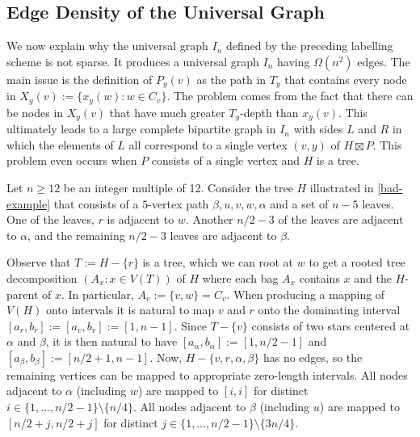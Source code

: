 \documentclass{patmorin}
\begin{document}
\subsection{Edge Density of the Universal Graph}
\label{density-lower-bound}

We now explain why the universal graph $I_n$ defined by the preceding labelling scheme is not sparse.  It produces a universal graph $I_n$ having $\Omega(n^2)$ edges.  The main issue is the definition of $P_y(v)$ as the path in $T_y$ that contains every node in $X_y(v):=\{x_y(w):w\in C_v\}$.  The problem comes from the fact that there can be nodes in $X_y(v)$ that have much greater $T_y$-depth than $x_y(v)$.  This ultimately leads to a large complete bipartite graph in $I_n$ with sides $L$ and $R$ in which the elements of $L$ all correspond to a single vertex $(v,y)$ of $H\boxtimes P$.  This problem even occurs when $P$ consists of a single vertex and $H$ is a tree.

Let $n\ge 12$ be an integer multiple of 12. Consider the tree $H$ illustrated in \cref{bad-example} that consists of a $5$-vertex path $\beta,u,v,w,\alpha$ and a set of $n-5$ leaves.  One of the leaves, $r$ is adjacent to $w$. Another $n/2-3$ of the leaves are adjacent to $\alpha$, and the remaining $n/2-3$ leaves are adjacent to $\beta$.

Observe that $T:=H-\{r\}$ is a tree, which we can root at $w$ to get a rooted tree decomposition $(A_x:x\in V(T))$ of $H$ where each bag $A_x$ contains $x$ and the $H$-parent of $x$.  In particular, $A_v:=\{v,w\}=C_v$.  When producing a mapping of $V(H)$ onto intervals it is natural to map $v$ and $r$ onto the dominating interval $[a_r,b_r]:=[a_v,b_v]:=[1,n-1]$.  Since $T-\{v\}$ consists of two stars centered at $\alpha$ and $\beta$, it is then natural to have $[a_\alpha,b_\alpha]:=[1, n/2-1]$ and $[a_\beta,b_\beta]:=[ n/2+1,n-1]$. Now, $H-\{v,r,\alpha,\beta\}$ has no edges, so the remaining vertices can be mapped to appropriate zero-length intervals. All nodes adjacent to $\alpha$ (including $w$) are mapped to $[i,i]$ for distinct $i\in\{1,\ldots, n/2-1\}\setminus\{n/4\}$. All nodes adjacent to $\beta$ (including $u$) are mapped to $[n/2+j, n/2+j]$ for distinct $j\in\{1,\ldots, n/2-1\}\setminus\{3n/4\}$.
\end{document}

